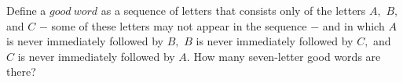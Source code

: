 Define a $good~word$ as a sequence of letters that consists only of the letters $A,$ $B,$ and $C$ $-$ some of these letters may not appear in the sequence $-$ and in which $A$ is never immediately followed by $B,$ $B$ is never immediately followed by $C,$ and $C$ is never immediately followed by $A.$ How many seven-letter good words are there?